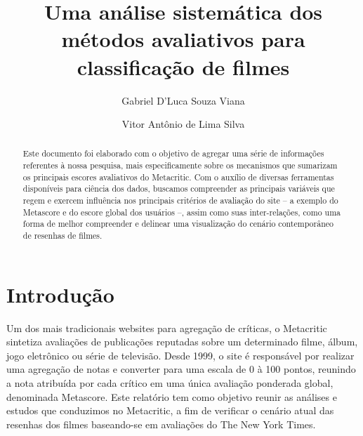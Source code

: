 \documentclass[review]{elsarticle}
\begin{document}
\begin{frontmatter}

\title{Uma análise sistemática dos métodos avaliativos para classificação de filmes}

\author{Gabriel D'Luca Souza Viana}
\author{Vitor Antônio de Lima Silva}
\address{Universidade Federal de Pernambuco – Centro de Informática
\linebreak Caixa Postal 7.851 – 50.732-970 – Recife, PE – Brasil
\linebreak gdsv@cin.ufpe.br, vals@cin.ufpe.br}


\begin{abstract}
Este documento foi elaborado com o objetivo de agregar uma série de informações referentes à nossa pesquisa, mais especificamente sobre os mecanismos que sumarizam os principais escores avaliativos do Metacritic. Com o auxílio de diversas ferramentas disponíveis para ciência dos dados, buscamos compreender as principais variáveis que regem e exercem influência nos principais critérios de avaliação do site – a exemplo do Metascore e do escore global dos usuários –, assim como suas inter-relações, como uma forma de melhor compreender e delinear uma visualização do cenário contemporâneo de resenhas de filmes. 
\end{abstract}

\end{frontmatter}

\linenumbers

\section{Introdução}

Um dos mais tradicionais websites para agregação de críticas, o Metacritic sintetiza avaliações de publicações reputadas sobre um determinado filme, álbum, jogo eletrônico ou série de televisão. Desde 1999, o site é responsável por realizar uma agregação de notas e converter para uma escala de 0 à 100 pontos, reunindo a nota atribuída por cada crítico em uma única avaliação ponderada global, denominada Metascore. Este relatório tem como objetivo reunir as análises e estudos que conduzimos no Metacritic, a fim de verificar o cenário atual das resenhas dos filmes baseando-se em avaliações do The New York Times. 
\end{document}
